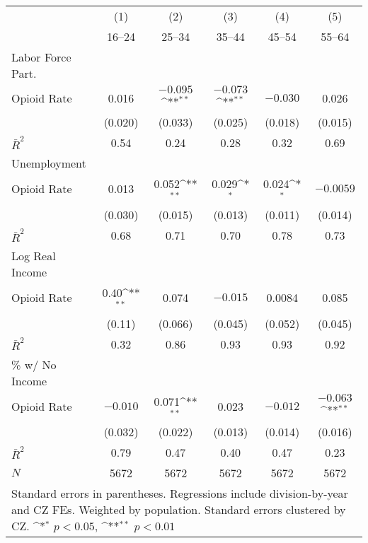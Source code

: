 {
\def\sym#1{\ifmmode^{#1}\else\(^{#1}\)\fi}
\begin{tabular}{l*{5}{c}}
\hline\hline
            &\multicolumn{1}{c}{(1)}&\multicolumn{1}{c}{(2)}&\multicolumn{1}{c}{(3)}&\multicolumn{1}{c}{(4)}&\multicolumn{1}{c}{(5)}\\
            &\multicolumn{1}{c}{16--24}&\multicolumn{1}{c}{25--34}&\multicolumn{1}{c}{35--44}&\multicolumn{1}{c}{45--54}&\multicolumn{1}{c}{55--64}\\
\hline\hline
Labor Force Part.\\
\hline
Opioid Rate &       0.016        &      $-0.095$\sym{**}&      $-0.073$\sym{**}&      $-0.030$        &       0.026        \\
            &     (0.020)        &     (0.033)        &     (0.025)        &     (0.018)        &     (0.015)        \\
\hline
$\bar{R}^2$ &        0.54        &        0.24        &        0.28        &        0.32        &        0.69        \\
\hline\hline
Unemployment\\
\hline
Opioid Rate &       0.013        &       0.052\sym{**}&       0.029\sym{*} &       0.024\sym{*} &     $-0.0059$        \\
            &     (0.030)        &     (0.015)        &     (0.013)        &     (0.011)        &     (0.014)        \\
\hline
$\bar{R}^2$ &        0.68        &        0.71        &        0.70        &        0.78        &        0.73        \\
\hline\hline
Log Real Income\\
\hline
Opioid Rate &        0.40\sym{**}&       0.074        &      $-0.015$        &      0.0084        &       0.085        \\
            &      (0.11)        &     (0.066)        &     (0.045)        &     (0.052)        &     (0.045)        \\
\hline
$\bar{R}^2$ &        0.32        &        0.86        &        0.93        &        0.93        &        0.92        \\
\hline\hline
\% w/ No Income\\
\hline
Opioid Rate &      $-0.010$        &       0.071\sym{**}&       0.023        &      $-0.012$        &      $-0.063$\sym{**}\\
            &     (0.032)        &     (0.022)        &     (0.013)        &     (0.014)        &     (0.016)        \\
\hline
$\bar{R}^2$ &        0.79        &        0.47        &        0.40        &        0.47        &        0.23        \\
$N$         &        5672        &        5672        &        5672        &        5672        &        5672        \\
\hline\hline
\multicolumn{6}{p{0.65\linewidth}}{\footnotesize Standard errors in parentheses.  Regressions include division-by-year and CZ FEs.  Weighted by population.  Standard errors clustered by CZ.  \sym{*} \(p<0.05\), \sym{**} \(p<0.01\)}\\
\end{tabular}
}
